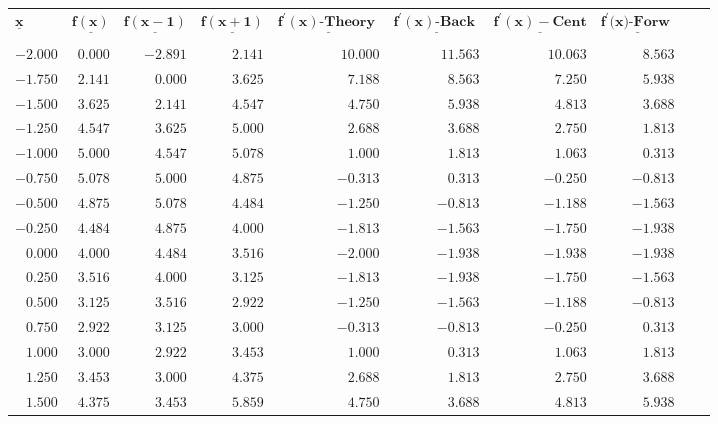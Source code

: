 \documentclass[../main.tex]{subfiles}
\begin{document}
\begin{enumerate}[label=\bfseries(\alph*)]
\section{}
\begin{tabular}{rrrrrrrrrr}
\multicolumn{1}{l}{$\underline{\mathbf{x}}$} & $\underline{\mathbf{f}(\mathbf{x})}$ & $\underline{\mathbf{f}(\mathbf{x}-\mathbf{1})}$ & $\underline{\mathbf{f}(\mathbf{x}+\mathbf{1})}$ & $\underline{\mathbf{f}^{\prime}(\mathbf{x}) \textbf {-Theory }}$ & $\underline{\mathbf{f}^{\prime}(\mathbf{x}) \textbf {-Back }}$ & $\underline{\mathbf{f}^{\prime}(\mathbf{x})-\mathbf{C e n t}}$ & $\underline{\mathbf{{f}^{\prime}(}\mathbf{{x})} \textbf {-Forw }}$ \\\\
$-2.000$ & $0.000$ & $-2.891$ & $2.141$ & $10.000$ & $11.563$ & $10.063$ & $8.563$ \\
$-1.750$ & $2.141$ & $0.000$ & $3.625$ & $7.188$ & $8.563$ & $7.250$ & $5.938$ \\
$-1.500$ & $3.625$ & $2.141$ & $4.547$ & $4.750$ & $5.938$ & $4.813$ & $3.688$ \\
$-1.250$ & $4.547$ & $3.625$ & $5.000$ & $2.688$ & $3.688$ & $2.750$ & $1.813$ \\
$-1.000$ & $5.000$ & $4.547$ & $5.078$ & $1.000$ & $1.813$ & $1.063$ & $0.313$ \\
$-0.750$ & $5.078$ & $5.000$ & $4.875$ & $-0.313$ & $0.313$ & $-0.250$ & $-0.813$ \\
$-0.500$ & $4.875$ & $5.078$ & $4.484$ & $-1.250$ & $-0.813$ & $-1.188$ & $-1.563$ \\
$-0.250$ & $4.484$ & $4.875$ & $4.000$ & $-1.813$ & $-1.563$ & $-1.750$ & $-1.938$ \\
$0.000$ & $4.000$ & $4.484$ & $3.516$ & $-2.000$ & $-1.938$ & $-1.938$ & $-1.938$ \\
$0.250$ & $3.516$ & $4.000$ & $3.125$ & $-1.813$ & $-1.938$ & $-1.750$ & $-1.563$ \\
$0.500$ & $3.125$ & $3.516$ & $2.922$ & $-1.250$ & $-1.563$ & $-1.188$ & $-0.813$ \\
$0.750$ & $2.922$ & $3.125$ & $3.000$ & $-0.313$ & $-0.813$ & $-0.250$ & $0.313$ \\
$1.000$ & $3.000$ & $2.922$ & $3.453$ & $1.000$ & $0.313$ & $1.063$ & $1.813$ \\
$1.250$ & $3.453$ & $3.000$ & $4.375$ & $2.688$ & $1.813$ & $2.750$ & $3.688$ \\
$1.500$ & $4.375$ & $3.453$ & $5.859$ & $4.750$ & $3.688$ & $4.813$ & $5.938$ \\

\end{tabular}
\end{enumerate}
\end{document}
